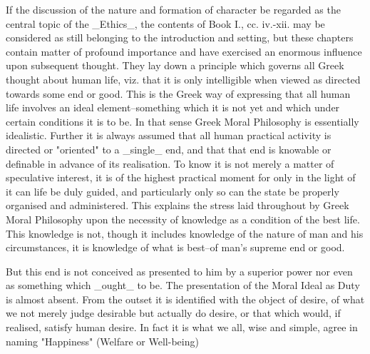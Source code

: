 If the discussion of the nature and formation of character be regarded
as the central topic of the _Ethics_, the contents of Book I., cc.
iv.-xii. may be considered as still belonging to the introduction and
setting, but these chapters contain matter of profound importance and
have exercised an enormous influence upon subsequent thought. They lay
down a principle which governs all Greek thought about human life, viz.
that it is only intelligible when viewed as directed towards some end or
good. This is the Greek way of expressing that all human life involves
an ideal element--something which it is not yet and which under certain
conditions it is to be. In that sense Greek Moral Philosophy is
essentially idealistic. Further it is always assumed that all human
practical activity is directed or "oriented" to a _single_ end, and that
that end is knowable or definable in advance of its realisation. To know
it is not merely a matter of speculative interest, it is of the highest
practical moment for only in the light of it can life be duly guided,
and particularly only so can the state be properly organised and
administered. This explains the stress laid throughout by Greek Moral
Philosophy upon the necessity of knowledge as a condition of the best
life. This knowledge is not, though it includes knowledge of the nature
of man and his circumstances, it is knowledge of what is best--of man's
supreme end or good.

But this end is not conceived as presented to him by a superior power
nor even as something which _ought_ to be. The presentation of the Moral
Ideal as Duty is almost absent. From the outset it is identified with
the object of desire, of what we not merely judge desirable but actually
do desire, or that which would, if realised, satisfy human desire. In
fact it is what we all, wise and simple, agree in naming "Happiness"
(Welfare or Well-being)

